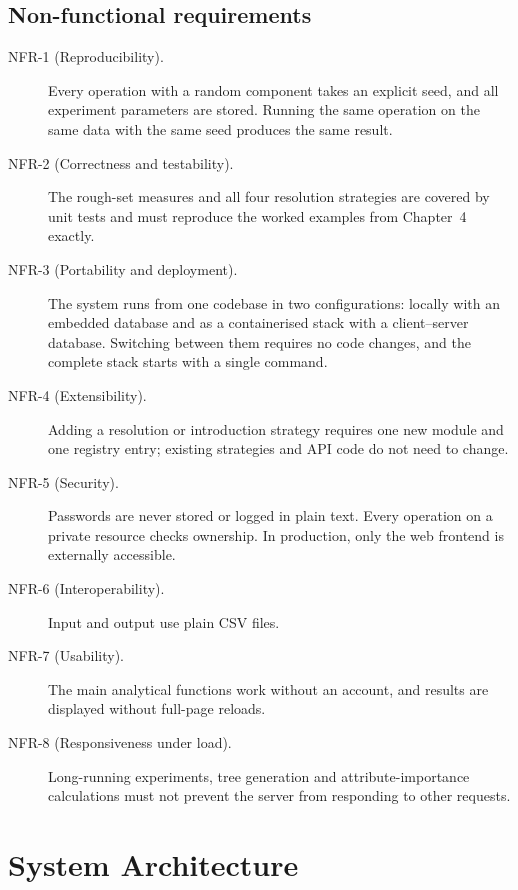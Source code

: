 \subsection{Non-functional requirements}

\begin{description}

\item[NFR-1 (Reproducibility).]
Every operation with a random component takes an explicit seed, and all
experiment parameters are stored. Running the same operation on the same data
with the same seed produces the same result.

\item[NFR-2 (Correctness and testability).]
The rough-set measures and all four resolution strategies are covered by unit
tests and must reproduce the worked examples from Chapter~4 exactly.

\item[NFR-3 (Portability and deployment).]
The system runs from one codebase in two configurations: locally with an embedded
database and as a containerised stack with a client--server database. Switching
between them requires no code changes, and the complete stack starts with a
single command.

\item[NFR-4 (Extensibility).]
Adding a resolution or introduction strategy requires one new module and one
registry entry; existing strategies and API code do not need to change.

\item[NFR-5 (Security).]
Passwords are never stored or logged in plain text. Every operation on a private
resource checks ownership. In production, only the web frontend is externally
accessible.

\item[NFR-6 (Interoperability).]
Input and output use plain CSV files.

\item[NFR-7 (Usability).]
The main analytical functions work without an account, and results are displayed
without full-page reloads.

\item[NFR-8 (Responsiveness under load).]
Long-running experiments, tree generation and attribute-importance calculations
must not prevent the server from responding to other requests.

\end{description}

\section{System Architecture}

